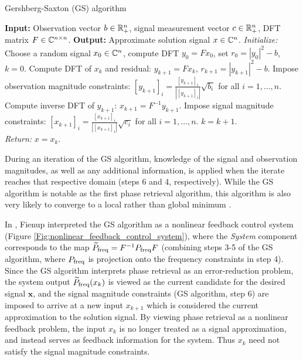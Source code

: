 \begin{algorithm}[H]
\caption{Gershberg-Saxton (GS) algorithm}	\label{Alg:GS}

\begin{algorithmic}[1]
	\Statex 	\textbf{Input:} Observation vector $b \in {\mathbb R}^n_+$, signal measurement vector $c \in {\mathbb R}^n_+$, DFT matrix $F \in {\mathbb C}^{n \times n}$.
	\Statex 	\textbf{Output:} Approximate solution signal $x \in {\mathbb C}^n$.
	\State 		\textit{Initialize:} Choose a random signal $x_0 \in {\mathbb C}^n$, compute DFT $y_0 = F x_0$, set $r_0=|y_0|^2 - b$, $k = 0$.
		\State 	Compute DFT of $x_k$ and residual: $y_{k+1} = F x_k$, $r_{k+1} = |y_{k+1}|^2 - b$.
		\State	Impose observation magnitude constraints: $[y_{k+1}]_i = \frac{[y_{k+1}]_i}{|[y_{k+1}]_i|} \sqrt{b_i}$ for all $i = 1, \ldots, n$.
		\State	Compute inverse DFT of $y_{k+1}$: $x_{k+1} = F^{-1} y_{k+1}$.
		\State	Impose signal magnitude constraints: $[x_{k+1}]_i = \frac{[x_{k+1}]_i}{|[x_{k+1}]_i|} \sqrt{c_i}$ for all $i = 1, \ldots, n$.
		\State	$k = k + 1$.
	\EndWhile	\\
	\textit{Return:} $x = x_k$.
\end{algorithmic}
\end{algorithm}

During an iteration of the GS algorithm, knowledge of the signal and observation magnitudes, as well as any additional information, is applied when the iterate reaches that respective domain (steps 6 and 4, respectively).  
While the GS algorithm is notable as the first phase retrieval algorithm, this algorithm is also very likely to converge to a local rather than global minimum \cite{DBLP:journals/corr/JaganathanEH15a}.




In \cite{Fienup82},  Fienup interpreted the GS algorithm as a nonlinear feedback control system (Figure \ref{Fig:nonlinear_feedback_control_system}), where the \textit{System} component corresponds to the map $\widetilde{P}_\textnormal{freq} = F^{-1} P_\textnormal{freq} F$ (combining steps 3-5 of the GS algorithm, where $P_\textnormal{freq}$ is projection onto the frequency constraints in step 4).  
Since the GS algorithm interprets phase retrieval as an error-reduction problem, the system output $\widetilde{P}_\textnormal{freq}(x_k)$ is viewed as the current candidate for the desired signal $\mathbf{x}$, and the signal magnitude constraints (GS algorithm, step 6) are imposed to arrive at a new input $x_{k+1}$ which is considered the current approximation to the solution signal.  
By viewing phase retrieval as a nonlinear feedback problem, the input $x_k$ is no longer treated as a signal approximation, and instead serves as feedback information for the system.  Thus $x_k$ need not satisfy the signal magnitude constraints.


